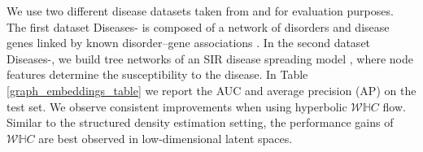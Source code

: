 We use two different disease datasets taken from \citep{chami2019hyperbolic} and \citep{mathieu2019continuous} for evaluation purposes. The first dataset Diseases- is composed of a network of disorders and disease genes linked by known disorder–gene associations \cite{goh2007human}. In the second dataset Diseases-, we build tree networks of an SIR disease spreading model \cite{anderson1992infectious}, where node features determine the susceptibility to the disease. In Table \ref{graph_embeddings_table} we report the AUC and average precision (AP) on the test set.
We observe consistent improvements when using hyperbolic $\mathcal{W}\mathbb{H}C$ flow. Similar to the structured density estimation setting, the performance gains of $\mathcal{W}\mathbb{H}C$ are best observed in low-dimensional latent spaces.




    
    
    
